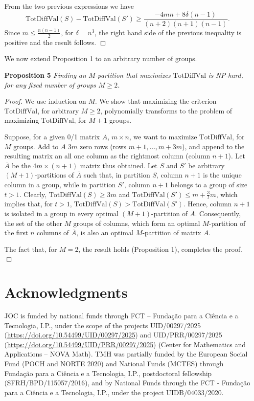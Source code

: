 From the two previous expressions we have
\[\mathrm{TotDiffVal}(S)-\mathrm{TotDiffVal}(S')\geq  \frac{-4mn + 8 \delta (n-1)}{(n+2)(n+1)(n-1)}. \]
Since \(m\leq \frac{n(n-1)}{2}\),
for \(\delta=n^3\), the right hand side of the previous inequality is positive and the result follows. \(\Box\)

We now extend Proposition 1 to an arbitrary number of groups.

\textbf{Proposition 5} \emph{Finding an \(M\)-partition that maximizes \(\mathrm{TotDiffVal}\) is NP-hard, for any fixed number of groups \(M\geq 2\).}

\emph{Proof.} We use induction on \(M\). We show that maximizing the criterion \(\mathrm{TotDiffVal}\), for arbitrary \(M\geq 2\), polynomially transforms to the problem of maximizing \(\mathrm{TotDiffVal}\), for \(M+1\) groups.

Suppose, for a given 0/1 matrix \(A\), \(m\times n\), we want to maximize \(\mathrm{TotDiffVal}\), for \(M\) groups.
Add to \(A\) \(3m\) zero rows (rows \(m+1, \dots, m+3m\)), and append to the resulting matrix an all one column as the rightmost column (column \(n+1\)). Let \(\bar{A}\) be the \(4m\times (n+1)\) matrix thus obtained. Let \(S\) and \(S'\) be arbitrary \((M+1)\)-partitions of \(\bar{A}\) such that, in partition \(S\), column \(n+1\) is the unique column in a group, while in partition \(S'\), column \(n+1\) belongs to a group of size \(t>1\). Clearly, \(\mathrm{TotDiffVal}(S)\geq 3m\) and \(\mathrm{TotDiffVal}(S')\leq m+ \frac{3}{t} m\), which implies that, for \(t>1\), \(\mathrm{TotDiffVal}(S) > \mathrm{TotDiffVal}(S')\). Hence, column \(n+1\) is isolated in a group in every optimal \((M+1)\)-partition of \(\bar{A}\). Consequently, the set of the other \(M\) groups of columns, which form an optimal \(M\)-partition of the first \(n\) columns of \(\bar{A}\), is also an optimal \(M\)-partition of matrix \(A\).

The fact that, for \(M=2\), the result holds (Proposition 1), completes the proof. \(\Box\)

\section*{Acknowledgments}\label{acknowledgments}

JOC is funded by national funds through FCT -- Fundação para a Ciência e a Tecnologia, I.P.,
under the scope of the projects UID/00297/2025 (\url{https://doi.org/10.54499/UID/00297/2025}) and UID/PRR/00297/2025 (\url{https://doi.org/10.54499/UID/PRR/00297/2025}) (Center for Mathematics and Applications -- NOVA Math). TMH was partially funded by the European Social Fund (POCH and NORTE 2020) and National Funds (MCTES) through Fundação para a Ciência e a Tecnologia, I.P., postdoctoral fellowship (SFRH/BPD/115057/2016), and by National Funds through the FCT - Fundação para a Ciência e a Tecnologia, I.P., under the project UIDB/04033/2020.

